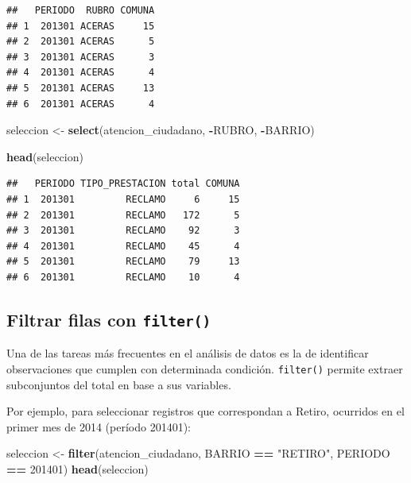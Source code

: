 \documentclass[spanish,]{book}
\newenvironment{Shaded}{\begin{snugshade}}{\end{snugshade}}
\newcommand{\DecValTok}[1]{\textcolor[rgb]{0.00,0.00,0.81}{#1}}
\newcommand{\KeywordTok}[1]{\textcolor[rgb]{0.13,0.29,0.53}{\textbf{#1}}}
\newcommand{\NormalTok}[1]{#1}
\newcommand{\OperatorTok}[1]{\textcolor[rgb]{0.81,0.36,0.00}{\textbf{#1}}}
\newcommand{\StringTok}[1]{\textcolor[rgb]{0.31,0.60,0.02}{#1}}
\begin{document}
\begin{verbatim}
##   PERIODO  RUBRO COMUNA
## 1  201301 ACERAS     15
## 2  201301 ACERAS      5
## 3  201301 ACERAS      3
## 4  201301 ACERAS      4
## 5  201301 ACERAS     13
## 6  201301 ACERAS      4
\end{verbatim}

\begin{Shaded}
\begin{Highlighting}[]
\NormalTok{seleccion <-}\StringTok{ }\KeywordTok{select}\NormalTok{(atencion_ciudadano, }\OperatorTok{-}\NormalTok{RUBRO, }\OperatorTok{-}\NormalTok{BARRIO)}

\KeywordTok{head}\NormalTok{(seleccion)}
\end{Highlighting}
\end{Shaded}

\begin{verbatim}
##   PERIODO TIPO_PRESTACION total COMUNA
## 1  201301         RECLAMO     6     15
## 2  201301         RECLAMO   172      5
## 3  201301         RECLAMO    92      3
## 4  201301         RECLAMO    45      4
## 5  201301         RECLAMO    79     13
## 6  201301         RECLAMO    10      4
\end{verbatim}

\hypertarget{filtrar-filas-con-filter}{%
\subsection{\texorpdfstring{Filtrar filas con \texttt{filter()}}{Filtrar filas con filter()}}\label{filtrar-filas-con-filter}}

Una de las tareas más frecuentes en el análisis de datos es la de identificar observaciones que cumplen con determinada condición. \texttt{filter()} permite extraer subconjuntos del total en base a sus variables.

Por ejemplo, para seleccionar registros que correspondan a Retiro, ocurridos en el primer mes de 2014 (período 201401):

\begin{Shaded}
\begin{Highlighting}[]
\NormalTok{seleccion <-}\StringTok{ }\KeywordTok{filter}\NormalTok{(atencion_ciudadano, BARRIO }\OperatorTok{==}\StringTok{ "RETIRO"}\NormalTok{, PERIODO }\OperatorTok{==}\StringTok{ }\DecValTok{201401}\NormalTok{)}
\KeywordTok{head}\NormalTok{(seleccion)}
\end{Highlighting}
\end{Shaded}
\end{document}
